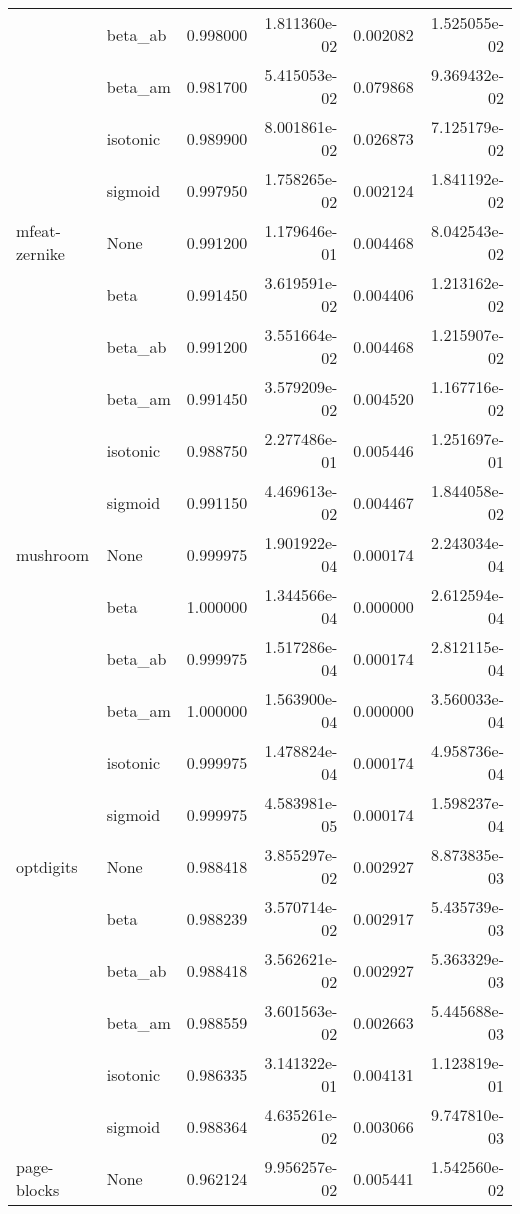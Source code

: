 \begin{tabular}{llrrrr}
        & beta\_ab &  0.998000 &  1.811360e-02 &  0.002082 &  1.525055e-02 \\
        & beta\_am &  0.981700 &  5.415053e-02 &  0.079868 &  9.369432e-02 \\
        & isotonic &  0.989900 &  8.001861e-02 &  0.026873 &  7.125179e-02 \\
        & sigmoid &  0.997950 &  1.758265e-02 &  0.002124 &  1.841192e-02 \\
mfeat-zernike & None &  0.991200 &  1.179646e-01 &  0.004468 &  8.042543e-02 \\
        & beta &  0.991450 &  3.619591e-02 &  0.004406 &  1.213162e-02 \\
        & beta\_ab &  0.991200 &  3.551664e-02 &  0.004468 &  1.215907e-02 \\
        & beta\_am &  0.991450 &  3.579209e-02 &  0.004520 &  1.167716e-02 \\
        & isotonic &  0.988750 &  2.277486e-01 &  0.005446 &  1.251697e-01 \\
        & sigmoid &  0.991150 &  4.469613e-02 &  0.004467 &  1.844058e-02 \\
mushroom & None &  0.999975 &  1.901922e-04 &  0.000174 &  2.243034e-04 \\
        & beta &  1.000000 &  1.344566e-04 &  0.000000 &  2.612594e-04 \\
        & beta\_ab &  0.999975 &  1.517286e-04 &  0.000174 &  2.812115e-04 \\
        & beta\_am &  1.000000 &  1.563900e-04 &  0.000000 &  3.560033e-04 \\
        & isotonic &  0.999975 &  1.478824e-04 &  0.000174 &  4.958736e-04 \\
        & sigmoid &  0.999975 &  4.583981e-05 &  0.000174 &  1.598237e-04 \\
optdigits & None &  0.988418 &  3.855297e-02 &  0.002927 &  8.873835e-03 \\
        & beta &  0.988239 &  3.570714e-02 &  0.002917 &  5.435739e-03 \\
        & beta\_ab &  0.988418 &  3.562621e-02 &  0.002927 &  5.363329e-03 \\
        & beta\_am &  0.988559 &  3.601563e-02 &  0.002663 &  5.445688e-03 \\
        & isotonic &  0.986335 &  3.141322e-01 &  0.004131 &  1.123819e-01 \\
        & sigmoid &  0.988364 &  4.635261e-02 &  0.003066 &  9.747810e-03 \\
page-blocks & None &  0.962124 &  9.956257e-02 &  0.005441 &  1.542560e-02 \\

\end{tabular}
